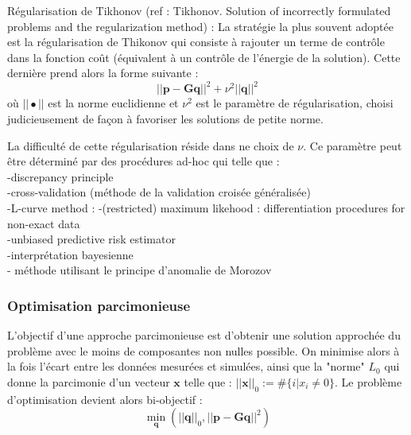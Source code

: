 Régularisation de Tikhonov (ref : Tikhonov. Solution of incorrectly formulated problems and the regularization method) : La stratégie la plus souvent adoptée est la régularisation de Thikonov qui consiste à rajouter un terme de contrôle dans la fonction coût (équivalent à un contrôle de l'énergie de la solution). Cette dernière prend alors la forme suivante : 
\begin{equation}
	||\bm{p}-\bm{G}\bm{q}||^2 + \nu^2||\bm{q}||^2
\end{equation}
où $||\bullet||$ est la norme euclidienne et $\nu^2$ est le paramètre de régularisation, choisi judicieusement de façon à favoriser les solutions de petite norme.

La difficulté de cette régularisation réside dans ne choix de $\nu$. Ce paramètre peut être déterminé par des procédures ad-hoc qui telle que : \\
-discrepancy principle\\
-cross-validation (méthode de la validation croisée généralisée)\\
-L-curve method : %
-(restricted) maximum likehood : %
differentiation procedures for non-exact data\\
-unbiased predictive risk estimator\\
-interprétation bayesienne \citep{Pereira2015}\\
- méthode utilisant le principe d’anomalie de Morozov\\

\subsubsection{Optimisation parcimonieuse}
L'objectif d'une approche parcimonieuse est d'obtenir une solution approchée du problème avec le moins de composantes non nulles possible. On minimise alors à la fois l'écart entre les données mesurées et simulées, ainsi que la "norme" $L_0$ qui donne la parcimonie d'un vecteur $\bm{x}$ telle que : $||\bm{x}||_0 := \#\{i|x_i\neq0\}$. Le problème d'optimisation devient alors bi-objectif : 
\begin{equation}
	\min_{\bm{q}}(||\bm{q}||_0 , ||\bm{p}-\bm{G}\bm{q}||^2) 
\end{equation}


